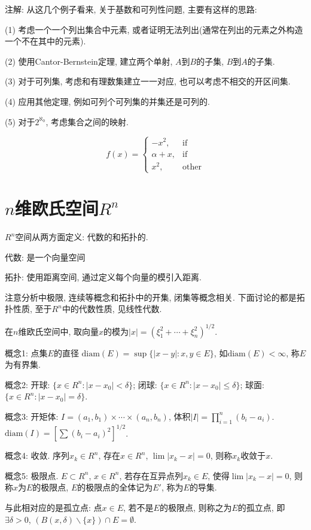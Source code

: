 \documentclass[12pt,a4paper,openany]{book}
\def\diam{\text{diam}}
\begin{document}
注解: 从这几个例子看来, 关于基数和可列性问题, 主要有这样的思路:

(1) 考虑一个一个列出集合中元素, 或者证明无法列出(通常在列出的元素之外构造一个不在其中的元素).

(2) 使用Cantor-Bernstein定理, 建立两个单射, $A$到$B$的子集, $B$到$A$的子集.

(3) 对于可列集, 考虑和有理数集建立一一对应, 也可以考虑不相交的开区间集.

(4) 应用其他定理, 例如可列个可列集的并集还是可列的.

(5) 对于$2^{\aleph_0}$, 考虑集合之间的映射.

$$
f(x) = 
\begin{cases}
-x^2, & \text{if} \\
\alpha + x, & \text{if} \\
x^2, &\text{other}
\end{cases}
$$

\section{$n$维欧氏空间$R^n$}

$R^n$空间从两方面定义: 代数的和拓扑的.

代数: 是一个向量空间

拓扑: 使用距离空间, 通过定义每个向量的模引入距离.

注意分析中极限, 连续等概念和拓扑中的开集, 闭集等概念相关. 下面讨论的都是拓扑性质, 至于$R^n$中的代数性质, 见线性代数.

在$n$维欧氏空间中, 取向量$x$的模为$|x| = (\xi_1^2 + \cdots + \xi_n^2)^{1/2}$.

概念1: 点集$E$的直径 $\text{diam}(E) = \sup\{ |x - y|: x, y \in E \}$, 如$\text{diam}(E) < \infty$, 称$E$为有界集.

概念2: 开球: $\{ x \in R^n : |x - x_0| < \delta\}$; 闭球: $\{ x \in R^n : |x - x_0| \le \delta \}$; 球面: $\{ x \in R^n : |x - x_0| = \delta \}$.

概念3: 开矩体: $I = (a_1, b_1) \times \cdots \times (a_n, b_n)$, 体积$|I| = \prod\limits_{i=1}^{n}{(b_i - a_i)}$. $\diam(I) = [\sum{(b_i - a_i)^2}]^{1/2}$.

概念4: 收敛. 序列$x_k \in R^n$, 存在$x \in R^n$, $\lim|x_k - x| = 0$, 则称$x_k$收敛于$x$.

概念5: 极限点. $E \subset R^n$, $x \in R^n$, 若存在互异点列$x_k \in E$, 使得$\lim|x_k - x| = 0$, 则称$x$为$E$的极限点, $E$的极限点的全体记为$E'$, 称为$E$的导集.

与此相对应的是孤立点: 点$x \in E$, 若不是$E$的极限点, 则称之为$E$的孤立点, 即$\exists \delta > 0$, $(B(x, \delta) \backslash \{x\}) \cap E = \emptyset$.
\end{document}
